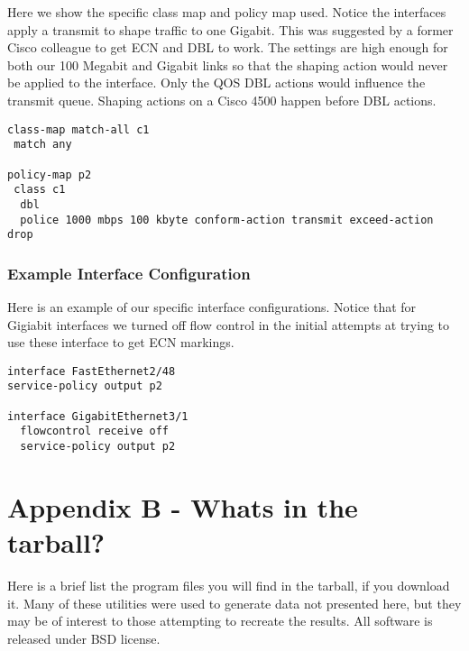 \documentclass[12pt]{article}
\begin{document}
Here we show the specific class map and policy map used. Notice
the interfaces apply a  transmit to shape traffic to one Gigabit. This was suggested
by a former Cisco colleague to get ECN and DBL to work. The settings
are high enough for both our 100 Megabit and Gigabit links so that 
the shaping action would never be applied to the interface. Only the
QOS DBL actions would influence the transmit queue. Shaping actions
on a Cisco 4500 happen before DBL actions.
\begin{verbatim}
class-map match-all c1
 match any 

policy-map p2
 class c1 
  dbl  
  police 1000 mbps 100 kbyte conform-action transmit exceed-action drop 
\end{verbatim}
\subsubsection {Example Interface Configuration}

Here is an example of our specific interface configurations. Notice that 
for Gigiabit interfaces we turned off flow control in the initial attempts at
trying to use these interface to get ECN markings.
\begin{verbatim}
interface FastEthernet2/48
service-policy output p2

interface GigabitEthernet3/1
  flowcontrol receive off
  service-policy output p2
\end{verbatim}


\section*{Appendix B - Whats in the tarball?}
Here is a brief list the program files you will find in the tarball, if you download it. Many of
these utilities were used to generate data not presented here, but they may be of interest
to those attempting to recreate the results. All software is released under BSD license.
\end{document}
